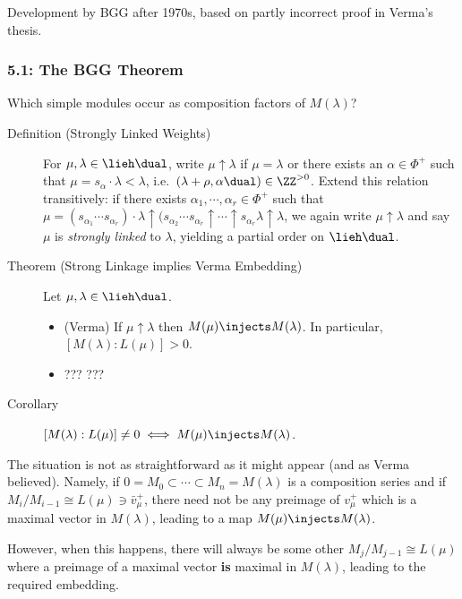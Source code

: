 Development by BGG after 1970s, based on partly incorrect proof in
Verma's thesis.

\hypertarget{the-bgg-theorem}{%
\subsubsection{5.1: The BGG Theorem}\label{the-bgg-theorem}}

Which simple modules occur as composition factors of \(M(\lambda)\)?

\begin{description}
\item[Definition (Strongly Linked Weights)]
For \(\mu, \lambda \in \lieh\dual\), write \(\mu \uparrow \lambda\) if
\(\mu = \lambda\) or there exists an \(\alpha \in \Phi^+\) such that
\(\mu = s_\alpha \cdot \lambda < \lambda\),
i.e.~\((\lambda + \rho, \alpha\dual) \in \ZZ^{> 0}\). Extend this
relation transitively: if there exists
\(\alpha_1, \cdots, \alpha_r \in \Phi^+\) such that
\(\mu = (s_{\alpha_1} \cdots s_{\alpha_r}) \cdot \lambda \uparrow (s_{\alpha_2} \cdots s_{\alpha_r} \uparrow \cdots \uparrow s_{\alpha_r} \lambda \uparrow \lambda\),
we again write \(\mu \uparrow\lambda\) and say \(\mu\) is \emph{strongly
linked} to \(\lambda\), yielding a partial order on \(\lieh\dual\).
\item[Theorem (Strong Linkage implies Verma Embedding)]
Let \(\mu, \lambda \in \lieh\dual\).

\begin{itemize}
\tightlist
\item
  (Verma) If \(\mu\uparrow \lambda\) then
  \(M(\mu) \injects M(\lambda)\). In particular,
  \([M(\lambda): L(\mu)] > 0\).
\item
  ??? ???
\end{itemize}
\item[Corollary]
\([M(\lambda): L(\mu)] \neq 0 \iff M(\mu) \injects M(\lambda)\).
\end{description}

The situation is not as straightforward as it might appear (and as Verma
believed). Namely, if
\(0 = M_0 \subset \cdots \subset M_n = M(\lambda)\) is a composition
series and if \(M_i / M_{i-1} \cong L(\mu) \ni \bar v_{\mu}^+\), there
need not be any preimage of \(v_\mu^+\) which is a maximal vector in
\(M(\lambda)\), leading to a map \(M(\mu) \injects M(\lambda)\).

However, when this happens, there will always be some other
\(M_j/M_{j-1} \cong L(\mu)\) where a preimage of a maximal vector
\textbf{is} maximal in \(M(\lambda)\), leading to the required
embedding.

